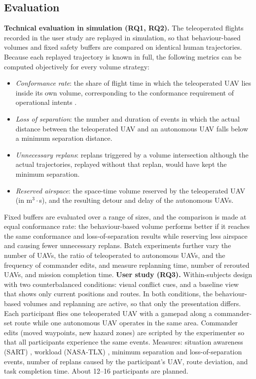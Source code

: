 \documentclass{article}
\begin{document}
\subsection{Evaluation}
\textbf{Technical evaluation in simulation (RQ1, RQ2).} The teleoperated flights recorded in the user study are replayed in simulation, so that behaviour-based volumes and fixed safety buffers are compared on identical human trajectories.
Because each replayed trajectory is known in full, the following metrics can be computed objectively for every volume strategy:
\begin{itemize}
  \item \emph{Conformance rate}: the share of flight time in which the teleoperated UAV lies inside its own volume, corresponding to the conformance requirement of operational intents \cite{astmf3548}.
  \item \emph{Loss of separation}: the number and duration of events in which the actual distance between the teleoperated UAV and an autonomous UAV falls below a minimum separation distance.
  \item \emph{Unnecessary replans}: replans triggered by a volume intersection although the actual trajectories, replayed without that replan, would have kept the minimum separation.
  \item \emph{Reserved airspace}: the space-time volume reserved by the teleoperated UAV (in m$^3\cdot$s), and the resulting detour and delay of the autonomous UAVs.
\end{itemize}
Fixed buffers are evaluated over a range of sizes, and the comparison is made at equal conformance rate: the behaviour-based volume performs better if it reaches the same conformance and loss-of-separation results while reserving less airspace and causing fewer unnecessary replans.
Batch experiments further vary the number of UAVs, the ratio of teleoperated to autonomous UAVs, and the frequency of commander edits, and measure replanning time, number of rerouted UAVs, and mission completion time.
\textbf{User study (RQ3).} Within-subjects design with two counterbalanced conditions: visual conflict cues, and a baseline view that shows only current positions and routes.
In both conditions, the behaviour-based volumes and replanning are active, so that only the presentation differs.
Each participant flies one teleoperated UAV with a gamepad along a commander-set route while one autonomous UAV operates in the same area.
Commander edits (moved waypoints, new hazard zones) are scripted by the experimenter so that all participants experience the same events.
Measures: situation awareness (SART) \cite{taylor1990}, workload (NASA-TLX) \cite{hart1988}, minimum separation and loss-of-separation events, number of replans caused by the participant's UAV, route deviation, and task completion time.
About 12--16 participants are planned.
\end{document}
